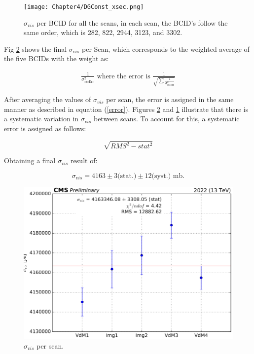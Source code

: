 \begin{center}
  \begin{figure}[h!]
    \centering
    \texttt{[image: Chapter4/DGConst\_xsec.png]}
    \caption[$\sigma_{vis}$ per BCID for all scans]{ $\sigma_{vis}$ per BCID for all the scans,  in each scan, the BCID's follow the same order, which is 282, 822, 2944, 3123, and 3302.}
    \label{sigmavis_perbcid}
  \end{figure}
\end{center}


Fig \ref{sigmavis_perscan} shows the final  $\sigma_{vis}$ per Scan, which corresponds to the weighted average of the five BCIDs with the weight as: 

\begin{eqnarray}
\frac{1}{\sigma_{vis\text{Err}}^{2}}  \text{     where the error is     } \frac{1}{\sqrt{\sum \frac{1}{\sigma_{vis\text{Err}}^{2}}}}
\label{error}
\end{eqnarray}

After averaging the values of $\sigma_{vis}$ per scan, the error is assigned in the same manner as described in equation (\ref{error}). Figures \ref{sigmavis_perscan} and \ref{sigmavis_perbcid} illustrate that there is a systematic variation in $\sigma_{vis}$ between scans. To account for this, a systematic error is assigned as follows:

\begin{equation}
\sqrt{RMS^{2}-stat^{2}}
\end{equation}

Obtaining a final  $\sigma_{vis}$ result of:

\begin{equation}
\sigma_{vis} = 4163 \pm 3 \text{(stat.)} \pm 12 \text{(syst.)} \text{ mb} .
\end{equation}

\begin{center}
  \begin{figure}[ht]
    \centering
    \includegraphics[scale=0.37]{Chapter4/xsec_perscan_v2.png}
    \caption[$\sigma_{vis}$ per Scan]{ $\sigma_{vis}$  per scan.} 
    \label{sigmavis_perscan}
  \end{figure}
\end{center}



